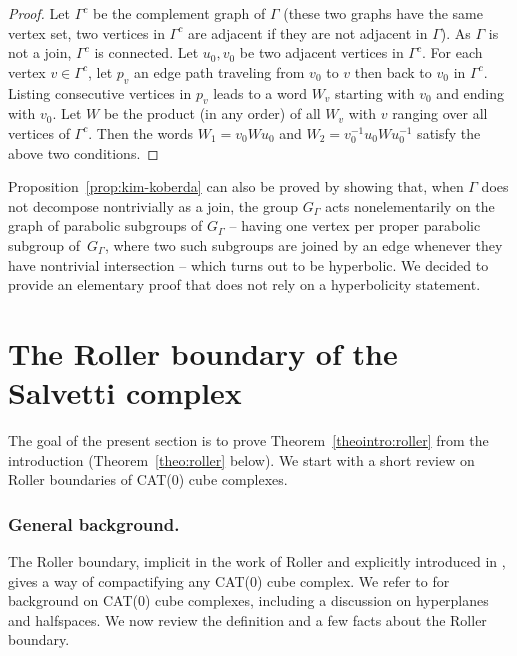 \begin{proof}
Let $\Gamma^c$ be the complement graph of $\Gamma$ (\ie these two graphs have the same vertex set, two vertices in $\Gamma^c$ are adjacent if they are not adjacent in $\Gamma$). As $\Gamma$ is not a join, $\Gamma^c$ is connected. Let $u_0,v_0$ be two adjacent vertices in $\Gamma^c$. For each vertex $v\in \Gamma^c$, let $p_v$ an edge path traveling from $v_0$ to $v$ then back to $v_0$ in $\Gamma^c$. Listing consecutive vertices in $p_v$ leads to a word $W_v$ starting with $v_0$ and ending with $v_0$. Let $W$ be the product (in any order) of all $W_v$ with $v$ ranging over all vertices of $\Gamma^c$. Then the words $W_1=v_0Wu_0$ and $W_2=v^{-1}_0u_0Wu^{-1}_0$ satisfy the above two conditions.
\end{proof}

\begin{rk}
Proposition~\ref{prop:kim-koberda} can also be proved by showing that, when $\Gamma$ does not decompose nontrivially as a join, the group $G_\Gamma$ acts nonelementarily on the graph of parabolic subgroups of $G_\Gamma$ -- having one vertex per proper parabolic subgroup of~$G_\Gamma$, where two such subgroups are joined by an edge whenever they have nontrivial intersection -- which turns out to be hyperbolic. We decided to provide an elementary proof that does not rely on a hyperbolicity statement.
\end{rk}

\section{The Roller boundary of the Salvetti complex}

The goal of the present section is to prove Theorem~\ref{theointro:roller} from the introduction (Theorem~\ref{theo:roller} below). We start with a short review on Roller boundaries of CAT(0) cube complexes.

\label{sec:background-roller}

\subsubsection*{General background.} The Roller boundary, implicit in the work of Roller \cite{Rol} and explicitly introduced in \cite{BCGNW}, gives a way of compactifying any CAT(0) cube complex. We refer to \cite{sageev2012cat} for background on CAT(0) cube complexes, including a discussion on hyperplanes and halfspaces. We now review the definition and a few facts about the Roller boundary.


